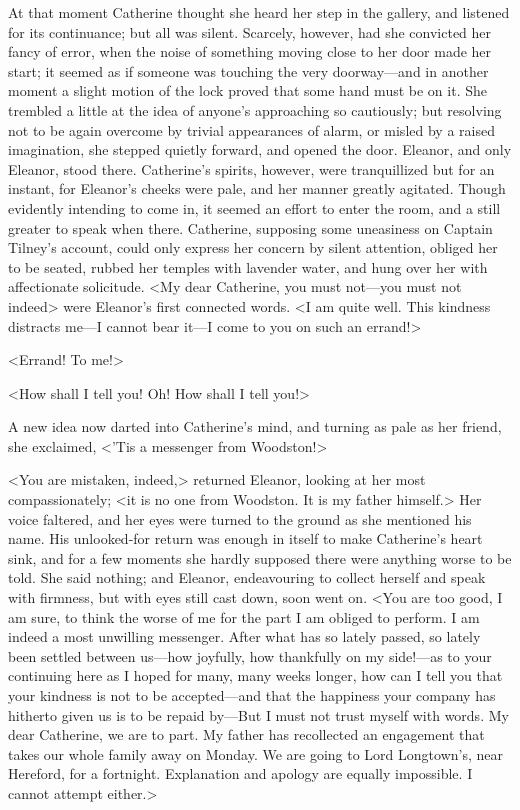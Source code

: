  At that moment Catherine thought she heard her step in the gallery, and listened for its continuance; but all was silent. Scarcely, however, had she convicted her fancy of error, when the noise of something moving close to her door made her start; it seemed as if someone was touching the very doorway—and in another moment a slight motion of the lock proved that some hand must be on it. She trembled a little at the idea of anyone's approaching so cautiously; but resolving not to be again overcome by trivial appearances of alarm, or misled by a raised imagination, she stepped quietly forward, and opened the door. Eleanor, and only Eleanor, stood there. Catherine's spirits, however, were tranquillized but for an instant, for Eleanor's cheeks were pale, and her manner greatly agitated. Though evidently intending to come in, it seemed an effort to enter the room, and a still greater to speak when there. Catherine, supposing some uneasiness on Captain Tilney's account, could only express her concern by silent attention, obliged her to be seated, rubbed her temples with lavender water, and hung over her with affectionate solicitude. <My dear Catherine, you must not—you must not indeed\longdash> were Eleanor's first connected words. <I am quite well. This kindness distracts me—I cannot bear it—I come to you on such an errand!> 

 <Errand! To me!> 

 <How shall I tell you! Oh! How shall I tell you!> 

 A new idea now darted into Catherine's mind, and turning as pale as her friend, she exclaimed, <'Tis a messenger from Woodston!> 

 <You are mistaken, indeed,> returned Eleanor, looking at her most compassionately; <it is no one from Woodston. It is my father himself.> Her voice faltered, and her eyes were turned to the ground as she mentioned his name. His unlooked-for return was enough in itself to make Catherine's heart sink, and for a few moments she hardly supposed there were anything worse to be told. She said nothing; and Eleanor, endeavouring to collect herself and speak with firmness, but with eyes still cast down, soon went on. <You are too good, I am sure, to think the worse of me for the part I am obliged to perform. I am indeed a most unwilling messenger. After what has so lately passed, so lately been settled between us—how joyfully, how thankfully on my side!—as to your continuing here as I hoped for many, many weeks longer, how can I tell you that your kindness is not to be accepted—and that the happiness your company has hitherto given us is to be repaid by—But I must not trust myself with words. My dear Catherine, we are to part. My father has recollected an engagement that takes our whole family away on Monday. We are going to Lord Longtown's, near Hereford, for a fortnight. Explanation and apology are equally impossible. I cannot attempt either.> 

